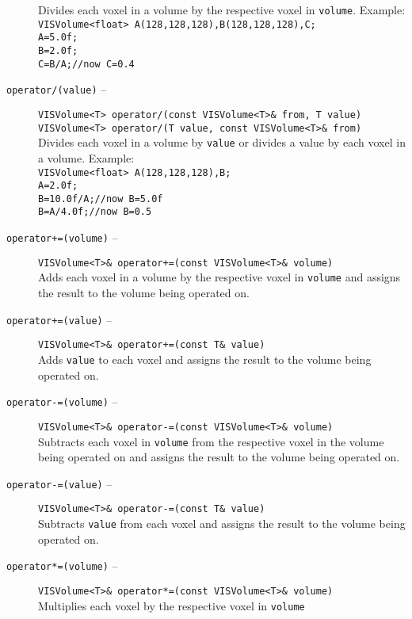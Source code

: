\begin{description}
Divides each voxel in a volume by the respective voxel in
{\tt volume}.  Example:\\
{\tt VISVolume<float> A(128,128,128),B(128,128,128),C;}\\
{\tt A=5.0f;}\\
{\tt B=2.0f;}\\
{\tt C=B/A;//now C=0.4}
\item[{\tt operator/(value)} --]
{\tt VISVolume<T> operator/(const VISVolume<T>\& from, T value)}\\
{\tt VISVolume<T> operator/(T value, const VISVolume<T>\& from)}\\
Divides each voxel in a volume by {\tt value} or divides a value by
each voxel in a volume.
Example:\\
{\tt VISVolume<float> A(128,128,128),B;}\\
{\tt A=2.0f;}\\
{\tt B=10.0f/A;//now B=5.0f}\\
{\tt B=A/4.0f;//now B=0.5}
\item[{\tt operator+=(volume)} --]
{\tt VISVolume<T>\& operator+=(const VISVolume<T>\& volume)}\\
Adds each voxel in a volume by the respective voxel in {\tt volume}
and assigns the result to the volume being operated on.
\item[{\tt operator+=(value)} --]
{\tt VISVolume<T>\& operator+=(const T\& value)}\\
Adds {\tt value} to each voxel and assigns the result to the volume being
operated on.
\item[{\tt operator-=(volume)} --]
{\tt VISVolume<T>\& operator-=(const VISVolume<T>\& volume)}\\
Subtracts each voxel in {\tt volume} from the respective voxel in the
volume being operated on and assigns the result to the volume being operated on.
\item[{\tt operator-=(value)} --]
{\tt VISVolume<T>\& operator-=(const T\& value)}\\
Subtracts {\tt value} from each voxel and assigns the result to the volume being
operated on.
\item[{\tt operator*=(volume)} --]
{\tt VISVolume<T>\& operator*=(const VISVolume<T>\& volume)}\\
Multiplies each voxel by the respective voxel in {\tt volume}

\end{description}

